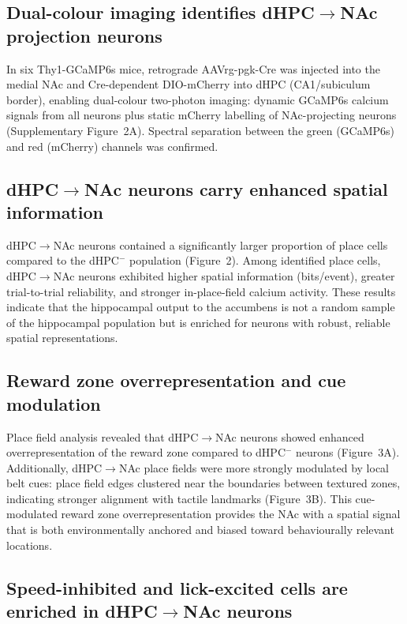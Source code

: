 \documentclass[11pt]{article}
\begin{document}
\subsection{Dual-colour imaging identifies dHPC$\to$NAc projection neurons}

In six Thy1-GCaMP6s mice, retrograde AAVrg-pgk-Cre was injected into the medial NAc and Cre-dependent DIO-mCherry into dHPC (CA1/subiculum border), enabling dual-colour two-photon imaging: dynamic GCaMP6s calcium signals from all neurons plus static mCherry labelling of NAc-projecting neurons (Supplementary Figure~2A). Spectral separation between the green (GCaMP6s) and red (mCherry) channels was confirmed.

\subsection{dHPC$\to$NAc neurons carry enhanced spatial information}

dHPC$\to$NAc neurons contained a significantly larger proportion of place cells compared to the dHPC$^{-}$ population (Figure~2). Among identified place cells, dHPC$\to$NAc neurons exhibited higher spatial information (bits/event), greater trial-to-trial reliability, and stronger in-place-field calcium activity. These results indicate that the hippocampal output to the accumbens is not a random sample of the hippocampal population but is enriched for neurons with robust, reliable spatial representations.

\subsection{Reward zone overrepresentation and cue modulation}

Place field analysis revealed that dHPC$\to$NAc neurons showed enhanced overrepresentation of the reward zone compared to dHPC$^{-}$ neurons (Figure~3A). Additionally, dHPC$\to$NAc place fields were more strongly modulated by local belt cues: place field edges clustered near the boundaries between textured zones, indicating stronger alignment with tactile landmarks (Figure~3B). This cue-modulated reward zone overrepresentation provides the NAc with a spatial signal that is both environmentally anchored and biased toward behaviourally relevant locations.

\subsection{Speed-inhibited and lick-excited cells are enriched in dHPC$\to$NAc neurons}
\end{document}
